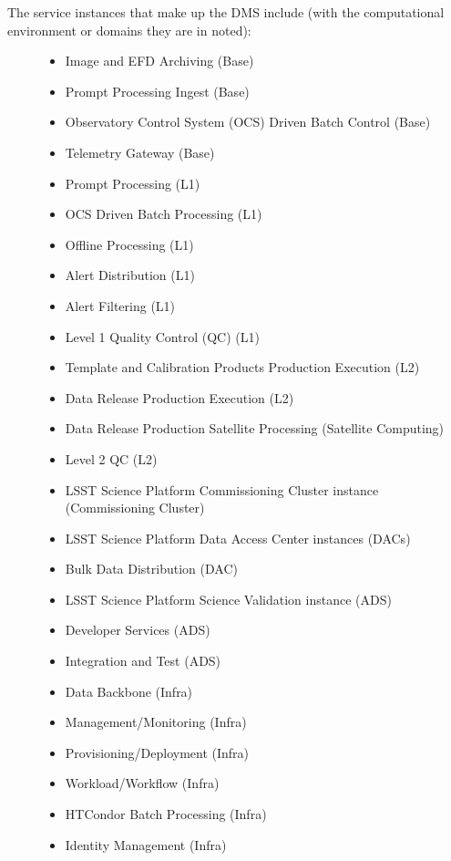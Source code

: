 \documentclass[]{article}
\providecommand{\tightlist}{%
  \setlength{\itemsep}{0pt}\setlength{\parskip}{0pt}}
\begin{document}
\begin{description}
\item[The service instances that make up the DMS include (with the
computational environment or domains they are in noted):]
\begin{itemize}
\tightlist
\item
  Image and EFD Archiving (Base)
\item
  Prompt Processing Ingest (Base)
\item
  Observatory Control System (OCS) Driven Batch Control (Base)
\item
  Telemetry Gateway (Base)
\item
  Prompt Processing (L1)
\item
  OCS Driven Batch Processing (L1)
\item
  Offline Processing (L1)
\item
  Alert Distribution (L1)
\item
  Alert Filtering (L1)
\item
  Level 1 Quality Control (QC) (L1)
\item
  Template and Calibration Products Production Execution (L2)
\item
  Data Release Production Execution (L2)
\item
  Data Release Production Satellite Processing (Satellite Computing)
\item
  Level 2 QC (L2)
\item
  LSST Science Platform Commissioning Cluster instance (Commissioning
  Cluster)
\item
  LSST Science Platform Data Access Center instances (DACs)
\item
  Bulk Data Distribution (DAC)
\item
  LSST Science Platform Science Validation instance (ADS)
\item
  Developer Services (ADS)
\item
  Integration and Test (ADS)
\item
  Data Backbone (Infra)
\item
  Management/Monitoring (Infra)
\item
  Provisioning/Deployment (Infra)
\item
  Workload/Workflow (Infra)
\item
  HTCondor Batch Processing (Infra)
\item
  Identity Management (Infra)
\end{itemize}
\end{description}
\end{document}
